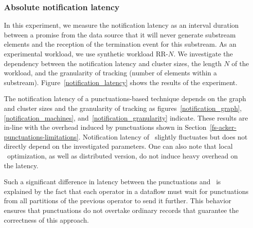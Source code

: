 \subsubsection{Absolute notification latency}
\label{absolute-latency}

In this experiment, we measure the notification latency as an interval duration between a promise from the data source that it will never generate substream elements and the reception of the termination event for this substream. As an experimental workload, we use synthetic workload RR-$N$. We investigate the dependency between the notification latency and cluster sizes, the length $N$ of the workload, and the granularity of tracking (number of elements within a substream). Figure~\ref{notification_latency} shows the results of the experiment. 

The notification latency of a punctuations-based technique depends on the graph and cluster sizes and the granularity of tracking as figures~\ref{notification_graph},\ref{notification_machines}, and~\ref{notification_granularity} indicate. These results are in-line with the overhead induced by punctuations shown in Section~\ref{fs-acker-punctuations-limitations}. Notification latency of \tracker\ slightly fluctuates but does not directly depend on the investigated parameters. One can also note that local \tracker\ optimization, as well as distributed version, do not induce heavy overhead on the latency.

Such a significant difference in latency between the punctuations and \tracker\ is explained by the fact that each operator in a dataflow must wait for punctuations from all partitions of the previous operator to send it further. This behavior ensures that punctuations do not overtake ordinary records that guarantee the correctness of this approach.

